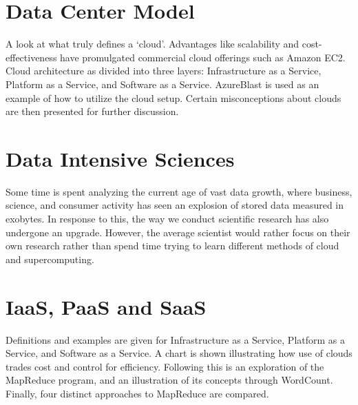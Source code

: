 \section{Data Center Model}

A look at what truly defines a `cloud'. Advantages like scalability and
cost-effectiveness have promulgated commercial cloud offerings such as
Amazon EC2. Cloud architecture as divided into three layers:
Infrastructure as a Service, Platform as a Service, and Software as a
Service. AzureBlast is used as an example of how to utilize the cloud
setup. Certain misconceptions about clouds are then presented for
further discussion.



\section{Data Intensive Sciences}

Some time is spent analyzing the current age of vast data growth, where
business, science, and consumer activity has seen an explosion of stored
data measured in exobytes. In response to this, the way we conduct
scientific research has also undergone an upgrade. However, the average
scientist would rather focus on their own research rather than spend
time trying to learn different methods of cloud and supercomputing.



\section{IaaS, PaaS and SaaS}

Definitions and examples are given for Infrastructure as a Service,
Platform as a Service, and Software as a Service. A chart is shown
illustrating how use of clouds trades cost and control for efficiency.
Following this is an exploration of the MapReduce program, and an
illustration of its concepts through WordCount. Finally, four distinct
approaches to MapReduce are compared.


